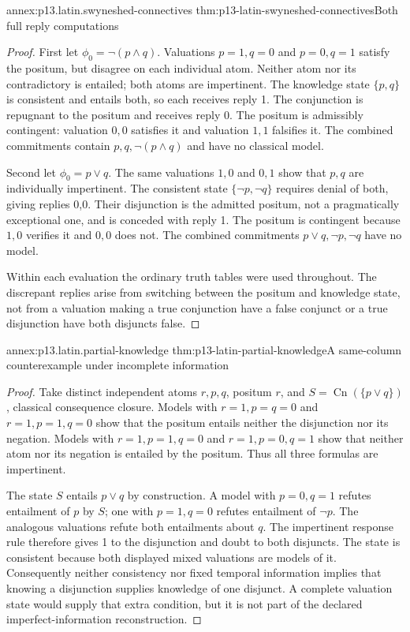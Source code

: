 \begin{annexitem}{annex:p13.latin.swyneshed-connectives}
 {thm:p13-latin-swyneshed-connectives}{Both full reply computations}
\begin{proof}
First let \(\phi_0=\neg(p\land q)\).
Valuations \(p=1,q=0\) and \(p=0,q=1\) satisfy the positum, but
disagree on each individual atom. Neither atom nor its contradictory
is entailed; both atoms are impertinent.
The knowledge state \(\{p,q\}\) is consistent and entails both,
so each receives reply 1.
The conjunction is repugnant to the positum and receives reply 0.
The positum is admissibly contingent: valuation \(0,0\) satisfies it
and valuation \(1,1\) falsifies it.
The combined commitments contain \(p,q,\neg(p\land q)\) and have
no classical model.

Second let \(\phi_0=p\lor q\).
The same valuations \(1,0\) and \(0,1\) show that \(p,q\) are individually
impertinent. The consistent state \(\{\neg p,\neg q\}\) requires denial
of both, giving replies 0,0. Their disjunction is the admitted positum,
not a pragmatically exceptional one, and is conceded with reply 1.
The positum is contingent because \(1,0\) verifies it and \(0,0\) does not.
The combined commitments \(p\lor q,\neg p,\neg q\) have no model.

Within each evaluation the ordinary truth tables were used throughout.
The discrepant replies arise from switching between the positum and
knowledge state, not from a valuation making a true conjunction have
a false conjunct or a true disjunction have both disjuncts false.
\end{proof}
\end{annexitem}

\begin{annexitem}{annex:p13.latin.partial-knowledge}
 {thm:p13-latin-partial-knowledge}{A same-column counterexample under incomplete information}
\begin{proof}
Take distinct independent atoms \(r,p,q\), positum \(r\), and
\(S=\operatorname{Cn}(\{p\lor q\})\), classical consequence closure.
Models with \(r=1,p=q=0\) and \(r=1,p=1,q=0\) show that the positum
entails neither the disjunction nor its negation.
Models with \(r=1,p=1,q=0\) and \(r=1,p=0,q=1\) show that neither
atom nor its negation is entailed by the positum.
Thus all three formulas are impertinent.

The state \(S\) entails \(p\lor q\) by construction.
A model with \(p=0,q=1\) refutes entailment of \(p\) by \(S\);
one with \(p=1,q=0\) refutes entailment of \(\neg p\).
The analogous valuations refute both entailments about \(q\).
The impertinent response rule therefore gives 1 to the disjunction
and doubt to both disjuncts. The state is consistent because both
displayed mixed valuations are models of it.
Consequently neither consistency nor fixed temporal information implies
that knowing a disjunction supplies knowledge of one disjunct.
A complete valuation state would supply that extra condition, but it
is not part of the declared imperfect-information reconstruction.
\end{proof}
\end{annexitem}
